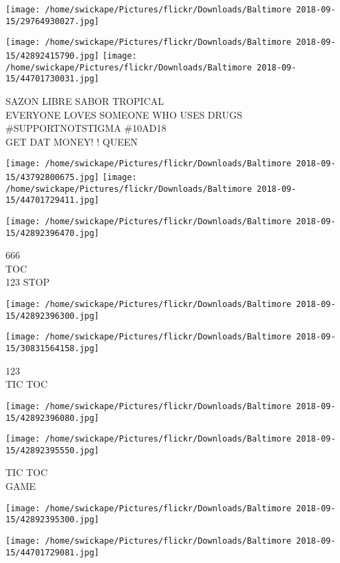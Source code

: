 \documentclass[10pt,letterpaper]{article}
\begin{document}
\texttt{[image: /home/swickape/Pictures/flickr/Downloads/Baltimore 2018-09-15/29764930027.jpg]}

\vspace{0.25in}
\texttt{[image: /home/swickape/Pictures/flickr/Downloads/Baltimore 2018-09-15/42892415790.jpg]}
\texttt{[image: /home/swickape/Pictures/flickr/Downloads/Baltimore 2018-09-15/44701730031.jpg]}

SAZON LIBRE SABOR TROPICAL\\
EVERYONE LOVES SOMEONE WHO USES DRUGS \#SUPPORTNOTSTIGMA \#10AD18\\
GET DAT MONEY! ! QUEEN
\pagebreak

\texttt{[image: /home/swickape/Pictures/flickr/Downloads/Baltimore 2018-09-15/43792800675.jpg]}
\texttt{[image: /home/swickape/Pictures/flickr/Downloads/Baltimore 2018-09-15/44701729411.jpg]}

\vspace{0.25in}
\texttt{[image: /home/swickape/Pictures/flickr/Downloads/Baltimore 2018-09-15/42892396470.jpg]}

666\\
TOC\\
123 STOP
\pagebreak

\texttt{[image: /home/swickape/Pictures/flickr/Downloads/Baltimore 2018-09-15/42892396300.jpg]}

\vspace{0.25in}
\texttt{[image: /home/swickape/Pictures/flickr/Downloads/Baltimore 2018-09-15/30831564158.jpg]}

123\\
TIC TOC
\pagebreak

\texttt{[image: /home/swickape/Pictures/flickr/Downloads/Baltimore 2018-09-15/42892396080.jpg]}

\vspace{0.25in}
\texttt{[image: /home/swickape/Pictures/flickr/Downloads/Baltimore 2018-09-15/42892395550.jpg]}

TIC TOC\\
GAME
\pagebreak

\texttt{[image: /home/swickape/Pictures/flickr/Downloads/Baltimore 2018-09-15/42892395300.jpg]}

\vspace{0.25in}
\texttt{[image: /home/swickape/Pictures/flickr/Downloads/Baltimore 2018-09-15/44701729081.jpg]}
\end{document}

